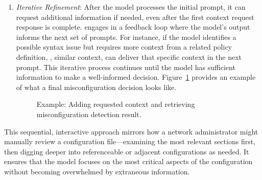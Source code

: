 \begin{enumerate}
    \item \textit{Iterative Refinement}: After the model processes the initial prompt, it can request additional information if needed, even after the first context request response is complete. \sysname{} engages in a feedback loop where the model’s output informs the next set of prompts. For instance, if the model identifies a possible syntax issue but requires more context from a related policy definition, \ie, similar context, \sysname{} can deliver that specific context in the next prompt. This iterative process continues until the model has sufficient information to make a well-informed decision. Figure~\ref{fig:feedback_and_response} provides an example of what a final misconfiguration decision looks like.
    \begin{figure}[t]
    \centering
    \caption{Example: Adding requested context and retrieving misconfiguration detection result.}
    \label{fig:feedback_and_response}
\end{figure}

\end{enumerate}

This sequential, interactive approach mirrors how a network administrator might manually review a configuration file—examining the most relevant sections first, then digging deeper into referenceable or adjacent configurations as needed. It ensures that the model focuses on the most critical aspects of the configuration without becoming overwhelmed by extraneous information.

